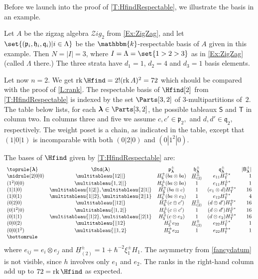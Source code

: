 \documentclass[a4paper,11pt]{amsart}
\newcommand\blam{{\boldsymbol\lambda}}
\numberwithin{equation}{subsection}
\theoremstyle{definition}
\theoremstyle{theorem}
\theoremstyle{remark}
\newcommand\plam[1][\lambda]{\mathfrak{p}_{#1}}
\newcommand\hlam[1][\lambda]{\mathfrak{h}_{#1}}
\newcommand\qlam[1][\lambda]{\mathfrak{q}_{#1}}
\newcommand\HJ{\underline{H}}
\newcommand\Basis[1][\pm]{\mathsf{B}^{#1}}
\newcommand\bS{{\mathsf{S}}}
\newcommand\bT{{\mathsf{T}}}
\newcommand\op{\operatorname}
\newcommand\kk{\mathbbm{k}}
\begin{document}
 Before we launch into the proof of \autoref{T:HfindRespectable},
 we illustrate the basis in an example.
\begin{Example}\label{Ex:HhdBasis}
   Let $A$ be the zigzag algebra $\mathcal{Z}ig_2$ from  \autoref{Ex:ZigZag}, and let
   $\set{(\plam[i],\hlam[i],\qlam[i])|i\in\Lambda}$ be the $\kk$-respectable basis of $A$
   given in this example. Then $N=|I|=3$, where $I=\Lambda=\set{1>2>3}$ as in \autoref{Ex:ZigZag} (called  $\Lambda$ there.) The three strata have $d_1=1$, $d_2=4$ and $d_3=1$ basis elements.

   Let now  $n=2$. We get $\op{rk}\Hfind=2!(\op{rk} A)^2=72$ which should be compared  with the proof of  \autoref{L:rank}.  The respectable basis of
   $\Hfind[2]$ from
   \autoref{T:HfindRespectable} is indexed by  the set $\Parts[3,2]$ of $3$-multipartitions
   of~$2$. The table below lists, for each $\blam\in\Parts[3,2]$, the possible tableaux $\bS$ and $\bT$ in
   column two.  In columns three and five we assume  $c,c'\in\plam[2],$ and $d,d'\in\qlam[2]$, respectively. The weight poset is a chain, as indicated in the table,  except that $(1|0|1)$ is incomparable with both $(0|2|0)$ and $(0|1^2|0)$.

  The bases of $\Hfind$ given by \autoref{T:HfindRespectable} are:
   \[
     \begin{array}{l*4cr}\toprule
       \blam  & \Std(\blam) & \plam[\blam]^\pm & \hlam[\blam]^\pm
              & \qlam[\blam]^\pm &|\Basis_\blam| \\ \midrule
       (2|0|0)   & \multitableau{12||} &H^\pm_\bS(ba\otimes ba)& \HJ^\pm_{(2)}
              & e_{11}H^{\pm*}_\bT&1\\
       (1^2|0|0) & \multitableau{1,2||}&H^\pm_\bS(ba \otimes ba)&1
              & e_{11}H^{\pm*}_\bT&1\\
       (1|1|0)   & \multitableau{1|2|}, \multitableau{2|1|}&H^\pm_\bS(ba \otimes c)
              & 1 & (e_1\otimes d)H^{\pm*}_\bT&16\\
       (1|0|1)   & \multitableau{1||2}, \multitableau{2||1}&H^\pm_\bS(ba \otimes e_2)
              & 1 & e_{12}H^{\pm*}_\bT&4\\
       (0|2|0)   & \multitableau{|12|}&H^\pm_\bS(c\otimes c')& \HJ^\pm_{(2)}
              & (d\otimes d')H^{\pm*}_\bT&16\\
       (0|1^2|0) & \multitableau{|1,2|}&H^\pm_\bS(c\otimes c')& 1
              & (d\otimes d')H^{\pm*}_\bT&16\\
       (0|1|1)   & \multitableau{|1|2}, \multitableau{|2|1}&H^\pm_\bS(c\otimes e_2)
              & 1 & (d\otimes e_2)H^{\pm*}_\bT&16\\
       (0|0|2)   & \multitableau{||12}&H^\pm_\bS e_{22}& \HJ^\pm_{(2)}
              & e_{22}H^{\pm*}_\bT&1\\
       (0|0|1^2) & \multitableau{||1,2}&H^\pm_\bS e_{22}& 1
              & e_{22}H^{\pm*}_\bT&1\\
       \bottomrule
     \end{array}
   \]
   where $e_{ij}=e_i\otimes e_j$ and
   $\HJ^\pm_{(2)}=1+\hbar^{-2}\xi^\pm_1H_1$. The asymmetry from
   \autoref{fancydatum} is not visible, since $h$ involves only $e_1$ and $e_2$. The ranks  in the right-hand column add up to  $72=\op{rk}\Hfind$ as expected.


\end{Example}
\end{document}
